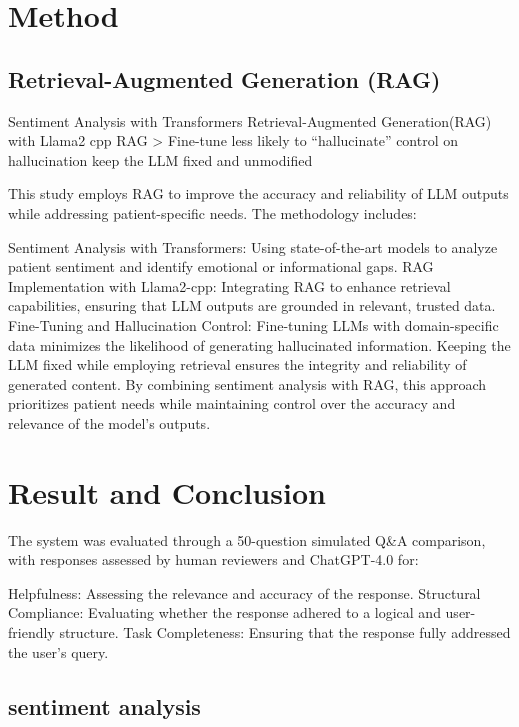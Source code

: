 \documentclass{article} %
\begin{document}
\section{Method}



\subsection{Retrieval-Augmented Generation (RAG)}

Sentiment Analysis with Transformers 
Retrieval-Augmented Generation(RAG) with Llama2 cpp
RAG > Fine-tune
less likely to “hallucinate”
control on hallucination
keep the LLM fixed and unmodified

This study employs RAG to improve the accuracy and reliability of LLM outputs while addressing patient-specific needs. The methodology includes:

Sentiment Analysis with Transformers: Using state-of-the-art models to analyze patient sentiment and identify emotional or informational gaps.
RAG Implementation with Llama2-cpp: Integrating RAG to enhance retrieval capabilities, ensuring that LLM outputs are grounded in relevant, trusted data.
Fine-Tuning and Hallucination Control:
Fine-tuning LLMs with domain-specific data minimizes the likelihood of generating hallucinated information.
Keeping the LLM fixed while employing retrieval ensures the integrity and reliability of generated content.
By combining sentiment analysis with RAG, this approach prioritizes patient needs while maintaining control over the accuracy and relevance of the model's outputs.

\section{Result and Conclusion}

The system was evaluated through a 50-question simulated Q&A comparison, with responses assessed by human reviewers and ChatGPT-4.0 for:

Helpfulness: Assessing the relevance and accuracy of the response.
Structural Compliance: Evaluating whether the response adhered to a logical and user-friendly structure.
Task Completeness: Ensuring that the response fully addressed the user’s query.

\subsection{sentiment analysis}
\end{document}
